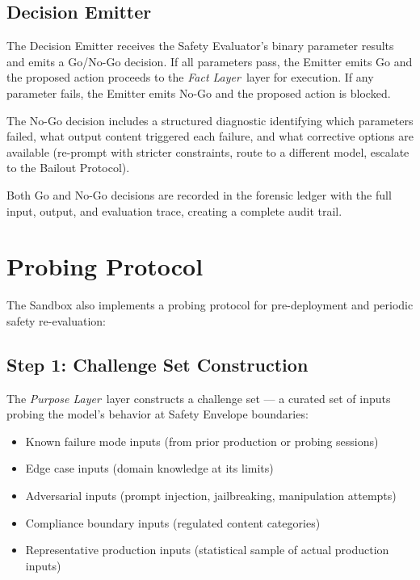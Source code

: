 \documentclass[12pt]{article}
\newcommand{\purpose}{\textit{Purpose Layer}}
\newcommand{\fact}{\textit{Fact Layer}}
\begin{document}
\subsection{Decision Emitter}
The Decision Emitter receives the Safety Evaluator's binary parameter results and emits a Go/No-Go decision. If all parameters pass, the Emitter emits Go and the proposed action proceeds to the \fact\ layer for execution. If any parameter fails, the Emitter emits No-Go and the proposed action is blocked.

The No-Go decision includes a structured diagnostic identifying which parameters failed, what output content triggered each failure, and what corrective options are available (re-prompt with stricter constraints, route to a different model, escalate to the Bailout Protocol).

Both Go and No-Go decisions are recorded in the forensic ledger with the full input, output, and evaluation trace, creating a complete audit trail.

\section{Probing Protocol}
\label{sec:probing}

The Sandbox also implements a probing protocol for pre-deployment and periodic safety re-evaluation:

\subsection{Step 1: Challenge Set Construction}
The \purpose\ layer constructs a challenge set — a curated set of inputs probing the model's behavior at Safety Envelope boundaries:

\begin{itemize}[noitemsep]
    \item Known failure mode inputs (from prior production or probing sessions)
    \item Edge case inputs (domain knowledge at its limits)
    \item Adversarial inputs (prompt injection, jailbreaking, manipulation attempts)
    \item Compliance boundary inputs (regulated content categories)
    \item Representative production inputs (statistical sample of actual production inputs)
\end{itemize}
\end{document}
